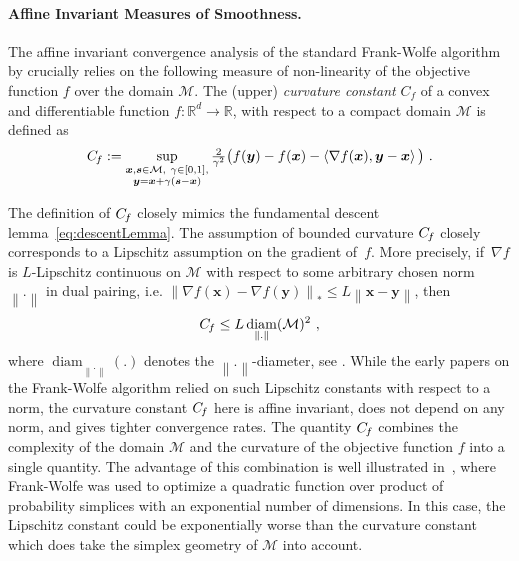 \documentclass{article} %
\DeclareMathOperator{\diam}{diam}
\providecommand{\norm}[1]{\left\lVert#1\right\rVert}
\newcommand{\R}{\mathbb{R}}
\newcommand{\domain}{\mathcal{M}} %
\newcommand{\stepsize}{\gamma}
\newcommand{\Cf}{C_{\hspace{-0.08em}f}}
\newcommand{\x}{\bm{x}}
\newcommand{\y}{\bm{y}}
\newcommand{\s}{\bm{s}}
\newcommand{\innerProd}[2]{\left\langle #1 , #2 \right\rangle}
\newcommand{\0}{\mathbf{0}} %
\begin{document}
\paragraph{Affine Invariant Measures of Smoothness.}
The affine invariant convergence analysis of the standard Frank-Wolfe
algorithm by \citep{Jaggi:2013wg} crucially relies on the following measure
of non-linearity of the objective function $f$ over the domain $\domain$. The
(upper) \emph{curvature constant} $C_{f}$ of a convex and differentiable
function $f:\R^d\rightarrow\R$, with respect to a compact domain $\domain$ is defined as
\begin{equation}\label{eq:Cf}
  \Cf := \sup_{\substack{\x,\s\in \domain,  ~\stepsize\in[0,1],\\
                      \y = \x+\stepsize(\s-\x)}} \textstyle
           \frac{2}{\stepsize^2}\big( f(\y)-f(\x)-\innerProd{\nabla f(\x)}{\y-\x}\big) \ .
\end{equation}

%
%
%
%

The definition of $\Cf$ closely mimics the fundamental descent
lemma~\eqref{eq:descentLemma}. 
The assumption of bounded curvature $\Cf$ closely corresponds to a Lipschitz
assumption on the gradient of~$f$. %
More precisely, if~$\nabla f$ is $L$-Lipschitz continuous on $\domain$ with
respect to some arbitrary chosen norm $\norm{.}$ in dual pairing, i.e.
$\norm{\nabla f(\x) - \nabla f(\y)}_* \leq L \norm{\x-\y}$, then
\begin{equation} \label{eq:CfBound}
\Cf \le L \diam_{\norm{.}}(\domain)^2  \ ,
\end{equation}
where $\diam_{\norm{.}}(.)$ denotes the $\norm{.}$-diameter, see \citep[Lemma
7]{Jaggi:2013wg}.
%
While the early papers \citep{Frank:1956vp,Dunn:1979da} on the Frank-Wolfe
algorithm relied on such Lipschitz constants with respect to a norm, 
the curvature constant $\Cf$ here is affine invariant, does not depend on any
norm, and gives tighter convergence rates. 
The quantity $\Cf$ combines the complexity of the domain $\domain$ and the curvature of the objective function $f$ into a
single quantity. The advantage of this combination is well illustrated in~\citep[Lemma A.1]{LacosteJulien:2013ue}, where Frank-Wolfe was used to
optimize a quadratic function over product of probability simplices with an
exponential number %
of dimensions. In this case, the Lipschitz constant could
be exponentially worse than the curvature constant which does take the simplex 
geometry of $\domain$ into account.
%
%
%
%
%
\end{document}
